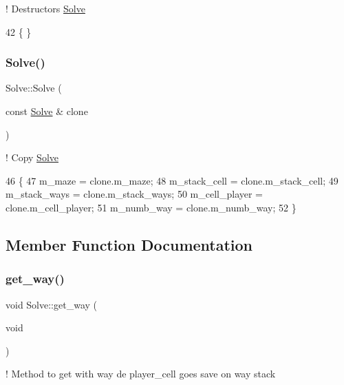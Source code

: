 ! Destructors \hyperlink{classSolve}{Solve} 


\begin{DoxyCode}
42 \{ \}
\end{DoxyCode}
\mbox{\label{classSolve_ac78c2c56eb847decb6efd070978a9a3d}} 
\subsubsection{\texorpdfstring{Solve()}{Solve()}\hspace{0.1cm}{\footnotesize\ttfamily [3/3]}}
{\footnotesize\ttfamily Solve\+::\+Solve (\begin{DoxyParamCaption}\item[{const \hyperlink{classSolve}{Solve} \&}]{clone }\end{DoxyParamCaption})\hspace{0.3cm}{\ttfamily [inline]}}



! Copy \hyperlink{classSolve}{Solve} 


\begin{DoxyCode}
46         \{   
47             m\_maze = clone.m\_maze;
48             m\_stack\_cell = clone.m\_stack\_cell;
49             m\_stack\_ways = clone.m\_stack\_ways;
50             m\_cell\_player = clone.m\_cell\_player;
51             m\_numb\_way = clone.m\_numb\_way;
52         \}
\end{DoxyCode}


\subsection{Member Function Documentation}
\mbox{\label{classSolve_a963b593c0311f03c7e4ce77eea818fa1}} 
\subsubsection{\texorpdfstring{get\+\_\+way()}{get\_way()}}
{\footnotesize\ttfamily void Solve\+::get\+\_\+way (\begin{DoxyParamCaption}\item[{void}]{ }\end{DoxyParamCaption})}



! Method to get with way de player\+\_\+cell goes save on way stack 


